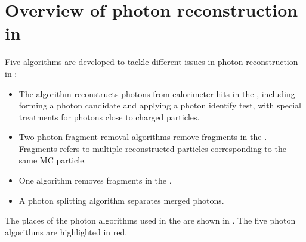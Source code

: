 
\section{Overview of photon reconstruction in \pandora}



Five algorithms are developed to tackle different issues in photon reconstruction in \pandora:
\begin{itemize}
  \item The \PhotonReconstruction algorithm reconstructs photons from calorimeter hits in the \ECAL, including forming a photon candidate and applying a photon identify test, with special treatments for photons close to charged particles.
  \item Two photon fragment removal algorithms remove fragments in the \ECAL. Fragments refers to multiple reconstructed particles corresponding to the same MC particle.
  \item  One algorithm removes fragments in the \HCAL.
  \item A photon splitting algorithm separates merged photons.
\end{itemize}

The places of the photon algorithms used  in the \pandora are shown in . The five photon algorithms are highlighted in red.



